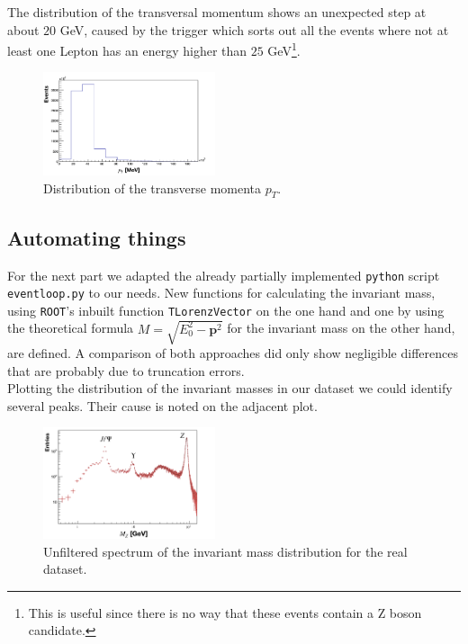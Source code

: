 \documentclass[twocolumn,
			   showpacs,%
               nofootinbib,
               aps,%
               prd,
               notitlepage,
               showkeys,
               10pt]{revtex4-1}
\begin{document}
The distribution of the transversal momentum shows an unexpected step at about $20$ GeV, caused by the trigger which sorts out all the events where not at least one Lepton has an energy higher than $25$ GeV\footnote{This is useful since there is no way that these events contain a Z boson candidate.}.
\begin{figure}[H]
	\centering
	\includegraphics[width=0.45\textwidth]{figures/plots/TransverseMomentum_corr}
	\caption{Distribution of the transverse momenta $p_T$.}
\end{figure}

\subsection{Automating things}
For the next part we adapted the already partially implemented \verb|python| script \verb|eventloop.py| to our needs. New functions for calculating the invariant mass, using \verb|ROOT|'s inbuilt function \verb|TLorenzVector| on the one hand and one by using the theoretical formula $M = \sqrt{E_0^2 - \mathbf{p}^2}$ for the invariant mass on the other hand, are defined. A comparison of both approaches did only show negligible differences that are probably due to truncation errors.\\

Plotting the distribution of the invariant masses in our dataset we could identify several peaks. Their cause is noted on the adjacent plot.
\begin{figure}[H]
	\centering
	\includegraphics[width=0.45\textwidth]{figures/plots/MassDist_Data_corr}
	\caption{Unfiltered spectrum of the invariant mass distribution for the real dataset.}
\end{figure}
\end{document}
